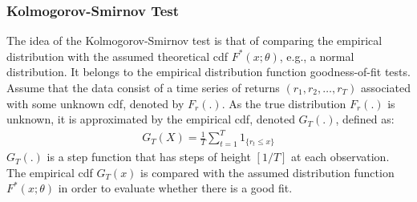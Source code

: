\documentclass[xcolor=dvipsnames, english, 8pt]{beamer}
\begin{document}
\begin{frame}
    \frametitle{Kolmogorov-Smirnov Test}
    The idea of the Kolmogorov-Smirnov test is that of comparing the empirical distribution with the assumed theoretical cdf $F^{*}(x;\theta)$, e.g., a normal distribution. It belongs to the empirical distribution function goodness-of-fit tests.\vspace{0.25cm}\\

     Assume that the data consist of a time series of returns $(r_1, r_2,\hdots, r_T )$ associated with some unknown cdf, denoted by $F_r (.)$. As the true distribution $F_r (.)$ is unknown, it is approximated by the
    empirical cdf, denoted $G_T (.)$, defined as:
    \begin{align}
        G_T(X) = \frac{1}{T}\sum\limits_{t=1}^T 1_{ \{r_t \leq x \} }
    \end{align}
    $G_T (.)$ is a step function that has steps of height $[1/T]$ at each observation. The empirical cdf
    $G_T (x)$ is compared with the assumed distribution function $F^{*}(x;\theta )$ in order to evaluate whether there is a
    good fit.


\end{frame}
\end{document}
